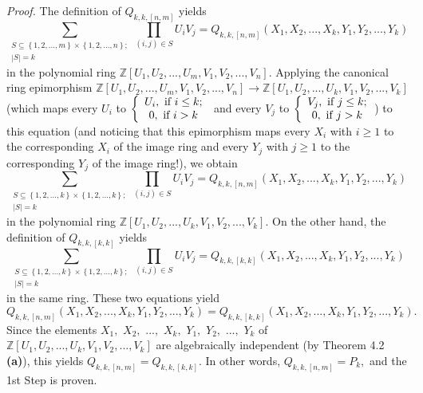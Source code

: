 \documentclass[numbers=enddot,12pt,final,onecolumn,notitlepage]{scrartcl}%
\begin{document}
\textit{Proof.} The definition of $Q_{k,k,\left[  n,m\right]  }$ yields
\[
\sum_{\substack{S\subseteq\left\{  1,2,...,m\right\}  \times\left\{
1,2,...,n\right\}  ;\\\left\vert S\right\vert =k}}\prod_{\left(  i,j\right)
\in S}U_{i}V_{j}=Q_{k,k,\left[  n,m\right]  }\left(  X_{1},X_{2}%
,...,X_{k},Y_{1},Y_{2},...,Y_{k}\right)
\]
in the polynomial ring $\mathbb{Z}\left[  U_{1},U_{2},...,U_{m},V_{1}%
,V_{2},...,V_{n}\right]  $. Applying the canonical ring epimorphism
$\mathbb{Z}\left[  U_{1},U_{2},...,U_{m},V_{1},V_{2},...,V_{n}\right]
\rightarrow\mathbb{Z}\left[  U_{1},U_{2},...,U_{k},V_{1},V_{2},...,V_{k}%
\right]  $ (which maps every $U_{i}$ to $\left\{
\begin{array}
[c]{c}%
U_{i},\text{ if }i\leq k;\\
0,\text{ if }i>k
\end{array}
\right.  $ and every $V_{j}$ to $\left\{
\begin{array}
[c]{c}%
V_{j},\text{ if }j\leq k;\\
0,\text{ if }j>k
\end{array}
\right.  $) to this equation (and noticing that this epimorphism maps every
$X_{i}$ with $i\geq1$ to the corresponding $X_{i}$ of the image ring and every
$Y_{j}$ with $j\geq1$ to the corresponding $Y_{j}$ of the image ring!), we
obtain%
\[
\sum_{\substack{S\subseteq\left\{  1,2,...,k\right\}  \times\left\{
1,2,...,k\right\}  ;\\\left\vert S\right\vert =k}}\prod_{\left(  i,j\right)
\in S}U_{i}V_{j}=Q_{k,k,\left[  n,m\right]  }\left(  X_{1},X_{2}%
,...,X_{k},Y_{1},Y_{2},...,Y_{k}\right)
\]
in the polynomial ring $\mathbb{Z}\left[  U_{1},U_{2},...,U_{k},V_{1}%
,V_{2},...,V_{k}\right]  $. On the other hand, the definition of
$Q_{k,k,\left[  k,k\right]  }$ yields%
\[
\sum_{\substack{S\subseteq\left\{  1,2,...,k\right\}  \times\left\{
1,2,...,k\right\}  ;\\\left\vert S\right\vert =k}}\prod_{\left(  i,j\right)
\in S}U_{i}V_{j}=Q_{k,k,\left[  k,k\right]  }\left(  X_{1},X_{2}%
,...,X_{k},Y_{1},Y_{2},...,Y_{k}\right)
\]
in the same ring. These two equations yield%
\[
Q_{k,k,\left[  n,m\right]  }\left(  X_{1},X_{2},...,X_{k},Y_{1},Y_{2}%
,...,Y_{k}\right)  =Q_{k,k,\left[  k,k\right]  }\left(  X_{1},X_{2}%
,...,X_{k},Y_{1},Y_{2},...,Y_{k}\right)  .
\]
Since the elements $X_{1},$ $X_{2},$ $...,$ $X_{k},$ $Y_{1},$ $Y_{2},$ $...,$
$Y_{k}$ of $\mathbb{Z}\left[  U_{1},U_{2},...,U_{k},V_{1},V_{2},...,V_{k}%
\right]  $ are algebraically independent (by Theorem 4.2 \textbf{(a)}), this
yields $Q_{k,k,\left[  n,m\right]  }=Q_{k,k,\left[  k,k\right]  }.$ In other
words, $Q_{k,k,\left[  n,m\right]  }=P_{k},$ and the 1st Step is proven.
\end{document}
